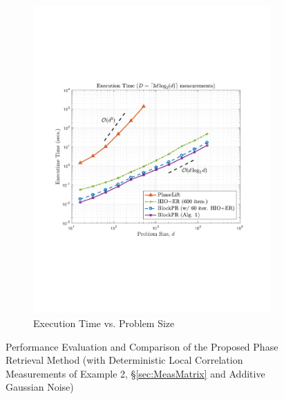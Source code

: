 \begin{figure}[hbtp]
\begin{subfigure}[b]{0.495\textwidth}
\includegraphics[clip=true, trim = 0.5in 2.5in 0.75in 2.5in,scale=0.45]{pics/fig5b}
\caption{Execution Time vs. Problem Size}
\label{fig:exectime}
\end{subfigure}
\caption{Performance Evaluation and Comparison of the Proposed Phase Retrieval Method 
(with Deterministic Local Correlation Measurements of Example 2, \S \ref{sec:MeasMatrix} and Additive Gaussian Noise)}
\label{fig:performance}
\end{figure}
%


